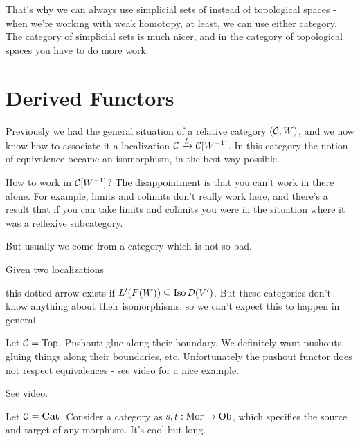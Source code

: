 \documentclass[../MH_Total.tex]{subfiles}
\begin{document}
That's why we can always use simplicial sets of instead of topological spaces - when we're working with weak homotopy, at least, we can use either category. The category of simplicial sets is much nicer, and in the category of topological spaces you have to do more work.

\section{Derived Functors}
Previously we had the general situation of a relative category $(\mathcal{C},W)$, and we now know how to associate it a localization $\mathcal{C} \xrightarrow{L} \mathcal{C}[W^{-1}]$. In this category the notion of equivalence became an isomorphism, in the best way possible.

How to work in $\mathcal{C}[W^{-1}]$? The disappointment is that you can't work in there alone. For example, limits and colimits don't really work here, and there's a result that if you can take limits and colimits you were in the situation where it was a reflexive subcategory.

But usually we come from a category which is not so bad.

Given two localizations
\begin{center}
\end{center}
this dotted arrow exists if $L'(F(W)) \subseteq \operatorname{Iso}\mathcal{D}(V')$. But these categories don't know anything about their isomorphisms, so we can't expect this to happen in general.

\begin{example}[(Colimits)]
	Let $\mathcal{C} = \operatorname{Top}$. Pushout: glue along their boundary. We definitely want pushouts, gluing things along their boundaries, etc. Unfortunately the pushout functor does not respect equivalences - see video for a nice example.
\end{example}

\begin{example}[(Limits)]
	See video.
\end{example}

\begin{example}
	Let $\mathcal{C} = \mathbf{Cat}$. Consider a category as $s,t: \operatorname{Mor} \to \operatorname{Ob}$, which specifies the source and target of any morphism. It's cool but long.
\end{example}
\end{document}
